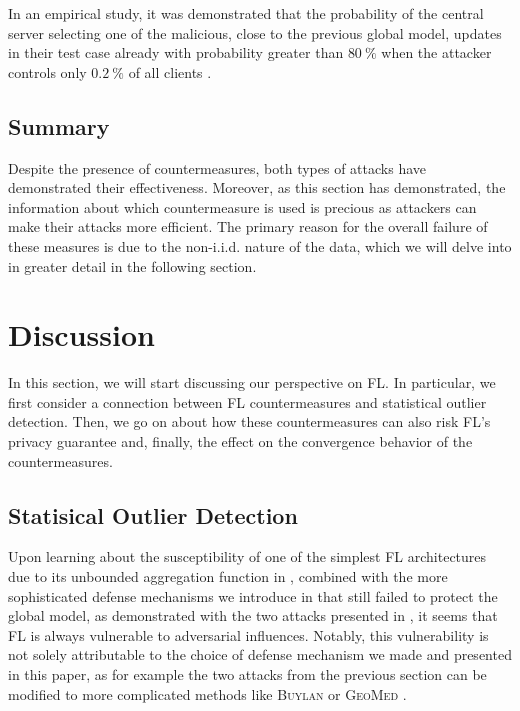 \documentclass[conference]{IEEEtran}
\begin{document}
In an empirical study, it was demonstrated that the probability of the central server selecting one of the malicious, close to the previous global model, updates in their test case already with probability greater than $\SI{80}{\percent}$ when the attacker controls only $\SI{0.2}{\percent}$ of all clients \cite{Bagdasaryan2018}.

\subsection*{Summary}
Despite the presence of countermeasures, both types of attacks have demonstrated their effectiveness. Moreover, as this section has demonstrated, the information about which countermeasure is used is precious as attackers can make their attacks more efficient.
The primary reason for the overall failure of these measures is due to the non-i.i.d. nature of the data, which we will delve into in greater detail in the following section.

\section{Discussion}\label{sec:discussion}
In this section, we will start discussing our perspective on FL. In particular, we first consider a connection between FL countermeasures and statistical outlier detection. Then, we go on about how these countermeasures can also risk FL's privacy guarantee and, finally, the effect on the convergence behavior of the countermeasures.

\subsection{Statisical Outlier Detection}
Upon learning about the susceptibility of one of the simplest FL architectures due to its unbounded aggregation function in , combined with the more sophisticated defense mechanisms we introduce in  that still failed to protect the global model, as demonstrated with the two attacks presented in , it seems that FL is always vulnerable to adversarial influences. Notably, this vulnerability is not solely attributable to the choice of defense mechanism we made and presented in this paper, as for example the two attacks from the previous section can be modified to more complicated methods like \textsc{Buylan} or \textsc{GeoMed} \cite{Bagdasaryan2018, Fang2019}. %
\end{document}
